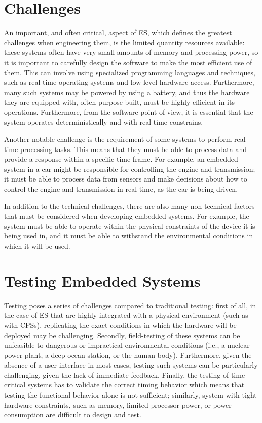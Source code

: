 \section {Challenges}
An important, and often critical, aspect of ES, which defines the greatest challenges when engineering them, is the limited quantity resources available: these systems often have very small amounts of memory and processing power, so it is important to carefully design the software to make the most efficient use of them. This can involve using specialized programming languages and techniques, such as real-time operating systems and low-level hardware access. Furthermore, many such systems may be powered by using a battery, and thus the hardware they are equipped with, often purpose built, must be highly efficient in its operations. Furthermore, from the software point-of-view, it is essential that the system operates deterministically and with real-time constrains.

Another notable challenge is the requirement of some systems to perform real-time processing tasks. This means that they must be able to process data and provide a response within a specific time frame. For example, an embedded system in a car might be responsible for controlling the engine and transmission; it must be able to process data from sensors and make decisions about how to control the engine and transmission in real-time, as the car is being driven.

In addition to the technical challenges, there are also many non-technical factors that must be considered when developing embedded systems. For example, the system must be able to operate within the physical constraints of the device it is being used in, and it must be able to withstand the environmental conditions in which it will be used.



\section{Testing Embedded Systems}
Testing \ess poses a series of challenges compared to traditional testing: first of all, in the case of ES that are highly integrated with a physical environment (such as with CPSs), replicating the exact conditions in which the hardware will be deployed may be challenging. Secondly, field-testing of these systems can be unfeasible to dangerous or impractical environmental conditions (i.e., a nuclear power plant, a deep-ocean station, or the human body). Furthermore, given the absence of a user interface in most cases, testing such systems can be particularly challenging, given the lack of immediate feedback. Finally, the testing of time-critical systems has to validate the correct timing behavior which means that testing the functional behavior alone is not sufficient; similarly, system with tight hardware constraints, such as memory, limited processor power, or power consumption are difficult to design and test.

